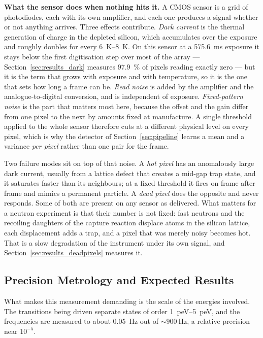 \documentclass[a4paper,headsepline,oneside,11pt]{scrartcl}
\begin{document}
\textbf{What the sensor does when nothing hits it.} A CMOS sensor is a grid of
photodiodes, each with its own amplifier, and each one produces a signal whether
or not anything arrives. Three effects contribute. \emph{Dark current} is the
thermal generation of charge in the depleted silicon, which accumulates over the
exposure and roughly doubles for every \SIrange[range-phrase={ to }]{6}{8}{\kelvin}.
On this sensor at a \SI{575.6}{\milli\second} exposure it stays below the first
digitisation step over most of the array --- Section~\ref{sec:results_dark}
measures \SI{97.9}{\percent} of pixels reading exactly zero --- but it is the
term that grows with exposure and with temperature, so it is the one that sets
how long a frame can be. \emph{Read noise}
is added by the amplifier and the analogue-to-digital conversion, and is
independent of exposure. \emph{Fixed-pattern noise} is the part that matters
most here, because the offset and the gain differ from one pixel to the next by
amounts fixed at manufacture. A single threshold applied to the whole sensor
therefore cuts at a different physical level on every pixel, which is why the
detector of Section~\ref{sec:pipeline} learns a mean and a variance
\emph{per pixel} rather than one pair for the frame.

Two failure modes sit on top of that noise. A \emph{hot pixel} has an
anomalously large dark current, usually from a lattice defect that creates a
mid-gap trap state, and it saturates faster than its neighbours; at a fixed
threshold it fires on frame after frame and mimics a permanent particle. A
\emph{dead pixel} does the opposite and never responds. Some of both are
present on any sensor as delivered. What matters for a neutron experiment is
that their number is not fixed: fast neutrons and the recoiling daughters of the
capture reaction displace atoms in the silicon lattice, each displacement adds a
trap, and a pixel that was merely noisy becomes hot. That is a slow degradation
of the instrument under its own signal, and
Section~\ref{sec:results_deadpixels} measures it.



\subsection{Precision Metrology and Expected Results}
\label{sec:probe_metrology}
What makes this measurement demanding is the scale of the energies involved.
The transitions being driven separate states of order
\SIrange{1}{5}{\pico\electronvolt}, and the frequencies are measured to about
\SI{0.05}{\hertz} out of ${\sim}\SI{900}{\hertz}$, a relative precision near
$10^{-5}$.
\end{document}
